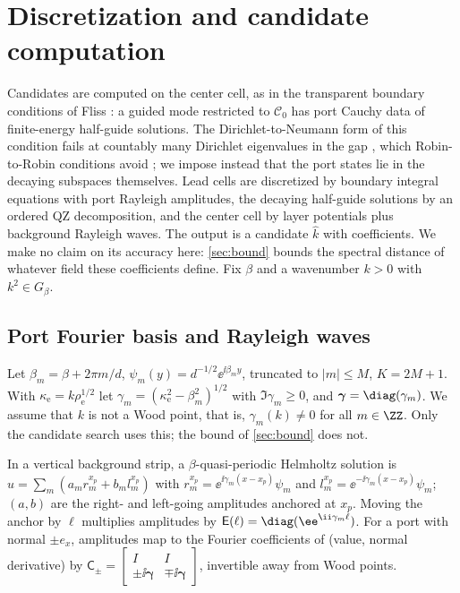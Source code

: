 \section{Discretization and candidate computation}\label{sec:discretization}

Candidates are computed on the center cell, as in the transparent boundary
conditions of Fliss \cite[Thm.~4.5]{Fliss2013}: a guided mode restricted to
$\mathcal C_0$ has port Cauchy data of finite-energy half-guide solutions. The
Dirichlet-to-Neumann form of this condition fails at countably many Dirichlet
eigenvalues in the gap \cite[Thm.~4.1]{Fliss2013}, which Robin-to-Robin
conditions avoid \cite{FlissKlindworthSchmidt2015}; we impose instead that the
port states lie in the decaying subspaces themselves. Lead cells are
discretized by boundary integral equations with port Rayleigh amplitudes, the
decaying half-guide solutions by an ordered QZ decomposition, and the center
cell by layer potentials plus background Rayleigh waves. The output is a
candidate $\widehat k$ with coefficients. We make no claim on its accuracy here:
\cref{sec:bound} bounds the spectral distance of whatever field these
coefficients define. Fix $\beta$ and a wavenumber $k>0$ with $k^2\in G_\beta$.

\subsection{Port Fourier basis and Rayleigh waves}
Let $\beta_m=\beta+2\pi m/d$, $\psi_m(y)=d^{-1/2}\ee^{\ii\beta_my}$, truncated to
$|m|\le M$, $K=2M+1$. With $\kappa_{\mathrm e}=k\rho_{\mathrm e}^{1/2}$ let
$\gamma_m=(\kappa_{\mathrm e}^2-\beta_m^2)^{1/2}$ with $\Im\gamma_m\ge0$, and
$\boldsymbol\gamma=\diag(\gamma_m)$. We assume that $k$ is not a Wood point,
that is, $\gamma_m(k)\ne0$ for all $m\in\ZZ$. Only the candidate search uses
this; the bound of \cref{sec:bound} does not.

In a vertical background strip, a $\beta$-quasi-periodic Helmholtz solution is
$u=\sum_m(a_mr_m^{x_p}+b_ml_m^{x_p})$ with
$r_m^{x_p}=\ee^{\ii\gamma_m(x-x_p)}\psi_m$ and
$l_m^{x_p}=\ee^{-\ii\gamma_m(x-x_p)}\psi_m$; $(a,b)$ are the right- and
left-going amplitudes anchored at $x_p$. Moving the anchor by $\ell$ multiplies
amplitudes by $\mathsf E(\ell)=\diag(\ee^{\ii\gamma_m\ell})$. For a port with
normal $\pm e_x$, amplitudes map to the Fourier coefficients of (value, normal
derivative) by $\mathsf C_\pm=\left[\begin{smallmatrix}I&I\\
\pm\ii\boldsymbol\gamma&\mp\ii\boldsymbol\gamma\end{smallmatrix}\right]$,
invertible away from Wood points.

